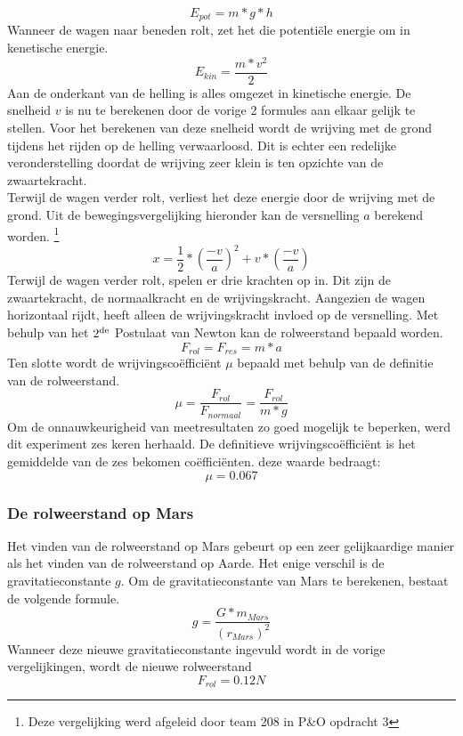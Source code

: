 \begin{equation}
E_{pot}=m*g*h
\end{equation}
Wanneer de wagen naar beneden rolt, zet het die potenti\"ele energie om in kenetische energie.
\begin{equation}
E_{kin}=\frac{m*v^2}{2}
\end{equation}
Aan de onderkant van de helling is alles omgezet in kinetische energie. De snelheid $v$ is nu te berekenen door de vorige 2 formules aan elkaar gelijk te stellen. Voor het berekenen van deze snelheid wordt de wrijving met de grond tijdens het rijden op de helling verwaarloosd. Dit is echter een redelijke veronderstelling doordat de wrijving zeer klein is ten opzichte van de zwaartekracht.\\
Terwijl de wagen verder rolt, verliest het deze energie door de wrijving met de grond. Uit de bewegingsvergelijking hieronder kan de versnelling $a$ berekend worden.
\footnote{Deze vergelijking werd afgeleid door team 208 in P\&O opdracht 3}
\begin{equation}
x=\frac{1}{2}*\left(\frac{-v}{a}\right)^2+v*\left(\frac{-v}{a}\right)
\end{equation}
Terwijl de wagen verder rolt, spelen er drie krachten op in. Dit zijn de zwaartekracht, de normaalkracht en de wrijvingskracht. Aangezien de wagen horizontaal rijdt, heeft alleen de wrijvingskracht invloed op de versnelling. Met behulp van het $2\textsuperscript{de}$ Postulaat van Newton kan de rolweerstand bepaald worden.
\begin{equation}
F_{rol}=F_{res}=m*a
\end{equation}
Ten slotte wordt de wrijvingsco\"effici\"ent $\mu$ bepaald met behulp van de definitie van de rolweerstand.
\begin{equation}
\mu=\frac{F_{rol}}{F_{normaal}}=\frac{F_{rol}}{m*g}
\end{equation}
Om de onnauwkeurigheid van meetresultaten zo goed mogelijk te beperken, werd dit experiment zes keren herhaald. De definitieve wrijvingscoëffici\"ent is het gemiddelde van de zes bekomen coëfficiënten. deze waarde bedraagt:$$\mu=0.067$$
\pagebreak
\subsubsection{De rolweerstand op Mars}
Het vinden van de rolweerstand op Mars gebeurt op een zeer gelijkaardige manier als het vinden van de rolweerstand op Aarde. Het enige verschil is de gravitatieconstante $g$. Om de gravitatieconstante van Mars te berekenen, bestaat de volgende formule.
\begin{equation}
g=\frac{G*m_{Mars}}{\left(r_{Mars}\right)^2}
\end{equation}
Wanneer deze nieuwe gravitatieconstante ingevuld wordt in de vorige vergelijkingen, wordt de nieuwe rolweerstand $$F_{rol}=0.12N$$
